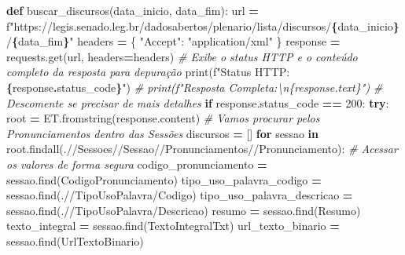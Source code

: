 \documentclass[
]{article}
\newenvironment{Shaded}{\begin{snugshade}}{\end{snugshade}}
\newcommand{\BuiltInTok}[1]{#1}
\newcommand{\CommentTok}[1]{\textcolor[rgb]{0.56,0.35,0.01}{\textit{#1}}}
\newcommand{\ControlFlowTok}[1]{\textcolor[rgb]{0.13,0.29,0.53}{\textbf{#1}}}
\newcommand{\DecValTok}[1]{\textcolor[rgb]{0.00,0.00,0.81}{#1}}
\newcommand{\KeywordTok}[1]{\textcolor[rgb]{0.13,0.29,0.53}{\textbf{#1}}}
\newcommand{\NormalTok}[1]{#1}
\newcommand{\OperatorTok}[1]{\textcolor[rgb]{0.81,0.36,0.00}{\textbf{#1}}}
\newcommand{\SpecialCharTok}[1]{\textcolor[rgb]{0.81,0.36,0.00}{\textbf{#1}}}
\newcommand{\SpecialStringTok}[1]{\textcolor[rgb]{0.31,0.60,0.02}{#1}}
\newcommand{\StringTok}[1]{\textcolor[rgb]{0.31,0.60,0.02}{#1}}
\begin{document}
\begin{Shaded}
\begin{Highlighting}[]
\KeywordTok{def}\NormalTok{ buscar\_discursos(data\_inicio, data\_fim):}
\NormalTok{    url }\OperatorTok{=} \SpecialStringTok{f"https://legis.senado.leg.br/dadosabertos/plenario/lista/discursos/}\SpecialCharTok{\{}\NormalTok{data\_inicio}\SpecialCharTok{\}}\SpecialStringTok{/}\SpecialCharTok{\{}\NormalTok{data\_fim}\SpecialCharTok{\}}\SpecialStringTok{"}
\NormalTok{    headers }\OperatorTok{=}\NormalTok{ \{}
        \StringTok{"Accept"}\NormalTok{: }\StringTok{"application/xml"}
\NormalTok{    \}}
\NormalTok{    response }\OperatorTok{=}\NormalTok{ requests.get(url, headers}\OperatorTok{=}\NormalTok{headers)}
    \CommentTok{\# Exibe o status HTTP e o conteúdo completo da resposta para depuração}
    \BuiltInTok{print}\NormalTok{(}\SpecialStringTok{f"Status HTTP: }\SpecialCharTok{\{}\NormalTok{response}\SpecialCharTok{.}\NormalTok{status\_code}\SpecialCharTok{\}}\SpecialStringTok{"}\NormalTok{)}
    \CommentTok{\# print(f"Resposta Completa:\textbackslash{}n\{response.text\}")  \# Descomente se precisar de mais detalhes}
    \ControlFlowTok{if}\NormalTok{ response.status\_code }\OperatorTok{==} \DecValTok{200}\NormalTok{:}
        \ControlFlowTok{try}\NormalTok{:}
\NormalTok{            root }\OperatorTok{=}\NormalTok{ ET.fromstring(response.content)}
            \CommentTok{\# Vamos procurar pelos Pronunciamentos dentro das Sessões}
\NormalTok{            discursos }\OperatorTok{=}\NormalTok{ []}
            \ControlFlowTok{for}\NormalTok{ sessao }\KeywordTok{in}\NormalTok{ root.findall(}\StringTok{\textquotesingle{}.//Sessoes//Sessao//Pronunciamentos//Pronunciamento\textquotesingle{}}\NormalTok{):}
                \CommentTok{\# Acessar os valores de forma segura}
\NormalTok{                codigo\_pronunciamento }\OperatorTok{=}\NormalTok{ sessao.find(}\StringTok{\textquotesingle{}CodigoPronunciamento\textquotesingle{}}\NormalTok{)}
\NormalTok{                tipo\_uso\_palavra\_codigo }\OperatorTok{=}\NormalTok{ sessao.find(}\StringTok{\textquotesingle{}.//TipoUsoPalavra/Codigo\textquotesingle{}}\NormalTok{)}
\NormalTok{                tipo\_uso\_palavra\_descricao }\OperatorTok{=}\NormalTok{ sessao.find(}\StringTok{\textquotesingle{}.//TipoUsoPalavra/Descricao\textquotesingle{}}\NormalTok{)}
\NormalTok{                resumo }\OperatorTok{=}\NormalTok{ sessao.find(}\StringTok{\textquotesingle{}Resumo\textquotesingle{}}\NormalTok{)}
\NormalTok{                texto\_integral }\OperatorTok{=}\NormalTok{ sessao.find(}\StringTok{\textquotesingle{}TextoIntegralTxt\textquotesingle{}}\NormalTok{)}
\NormalTok{                url\_texto\_binario }\OperatorTok{=}\NormalTok{ sessao.find(}\StringTok{\textquotesingle{}UrlTextoBinario\textquotesingle{}}\NormalTok{)}

\end{Highlighting}
\end{Shaded}
\end{document}
